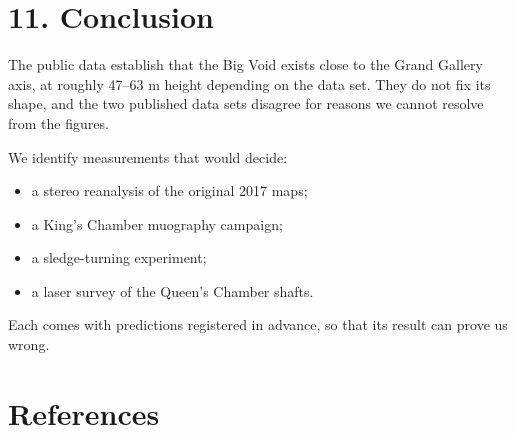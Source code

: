 \documentclass[
]{article}
\providecommand{\tightlist}{%
  \setlength{\itemsep}{0pt}\setlength{\parskip}{0pt}}
\begin{document}
\hypertarget{conclusion}{%
\section{11. Conclusion}\label{conclusion}}

The public data establish that the Big Void exists close to the Grand
Gallery axis, at roughly 47--63 m height depending on the data set. They
do not fix its shape, and the two published data sets disagree for
reasons we cannot resolve from the figures.

We identify measurements that would decide:

\begin{itemize}
\tightlist
\item
  a stereo reanalysis of the original 2017 maps;
\item
  a King's Chamber muography campaign;
\item
  a sledge-turning experiment;
\item
  a laser survey of the Queen's Chamber shafts.
\end{itemize}

Each comes with predictions registered in advance, so that its result
can prove us wrong.

\hypertarget{references}{%
\section{References}\label{references}}
\end{document}
